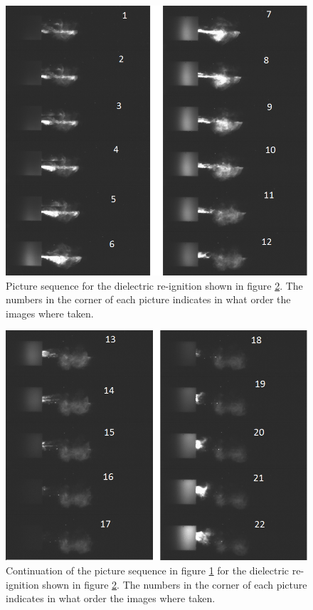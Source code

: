 \documentclass[10pt,b5paper,twoside]{article}
\begin{document}
\begin{figure}[H]
\centering
\includegraphics[scale=0.7, angle =0 ]{Bilder/Results/305_75_DR_TR.png}
\caption{Picture sequence for the dielectric re-ignition shown in figure \ref{fig:DR_TR_305_2}. The numbers in the corner of each picture indicates in what order the images where taken.} \label{fig:DR_TR_305_1}
\end{figure}

\begin{figure}[H]
\centering
\includegraphics[scale=0.7, angle =0 ]{Bilder/Results/305_75_DR_TR_2.png}
\caption{Continuation of the picture sequence in figure \ref{fig:DR_TR_305_1} for the dielectric re-ignition shown in figure \ref{fig:DR_TR_305_2}. The numbers in the corner of each picture indicates in what order the images where taken.} \label{fig:DR_TR_305_2}
\end{figure}
\end{document}
